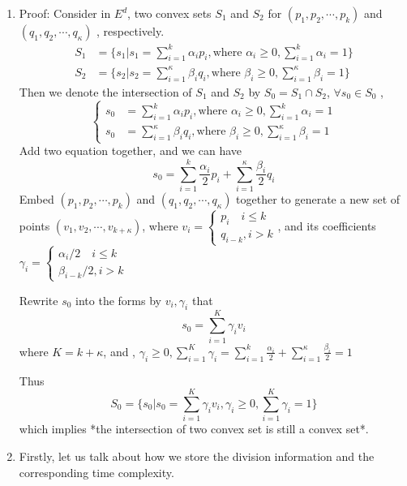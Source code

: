 \documentclass[]{article}
\begin{document}
\begin{enumerate}
	\item Proof:
		Consider in $E^d$, two convex sets $S_1$ and $S_2$ for $(p_1,p_2,\cdots,p_k)$ and $(q_1,q_2,\cdots,q_\kappa)$ , respectively.
	$$
	\begin{aligned}
		S_1&=\{s_1|s_1=\sum_{i=1}^k\alpha_ip_i, \text{where } \alpha_i\ge0, \sum_{i=1}^k\alpha_i=1\} \\
		S_2&=\{s_2|s_2=\sum_{i=1}^\kappa\beta_iq_i, \text{where } \beta_i\ge0, \sum_{i=1}^\kappa\beta_i=1\} 
	\end{aligned}
	$$
	Then we denote the intersection of $S_1$ and $S_2$ by $S_0=S_1\cap S_2$,  $\forall s_0\in S_0$ ,
	$$
	\begin{cases}
		s_0&=\sum_{i=1}^k\alpha_ip_i, \text{where } \alpha_i\ge0, \sum_{i=1}^k\alpha_i=1 \\
		s_0&=\sum_{i=1}^\kappa\beta_iq_i, \text{where } \beta_i\ge0, \sum_{i=1}^\kappa\beta_i=1 
	\end{cases}
	$$
	Add two equation together, and we can have
	$$
	s_0=\sum_{i=1}^k\frac{\alpha_i}{2}p_i + \sum_{i=1}^{\kappa}\frac{\beta_i}{2}q_i
	$$
	Embed $(p_1,p_2,\cdots,p_k)$ and $(q_1,q_2,\cdots,q_\kappa)$ together to generate a new set of points $(v_1, v_2,\cdots, v_{k+\kappa})$, where $v_i=\begin{cases}p_i\quad i\le k \\ q_{i-k}, i>k \end{cases}$, and its coefficients $\gamma_i=\begin{cases}\alpha_i / 2\quad i\le k \\ \beta_{i-k}/2, i>k \end{cases}$
	
	Rewrite $s_0$ into the forms by $v_i, \gamma_i$ that
	$$
	s_0=\sum_{i=1}^{K}\gamma_i v_i
	$$
	where $K=k+\kappa$, and , $\gamma_i\ge0, \sum_{i=1}^K\gamma_i=\sum_{i=1}^{k}\frac{\alpha_i}{2}+\sum_{i=1}^{\kappa}\frac{\beta_i}{2}=1$
	
	Thus 
	$$
	S_0 = \{s_0|s_0=\sum_{i=1}^{K}\gamma_i v_i,\gamma_i\ge0, \sum_{i=1}^K\gamma_i=1\}
	$$
	which implies *the intersection of two convex set is still a convex set*.

\newpage
	
	\item 
	Firstly, let us talk about how we store the division information and the corresponding time complexity. 
	\\
	

\end{enumerate}
\end{document}
